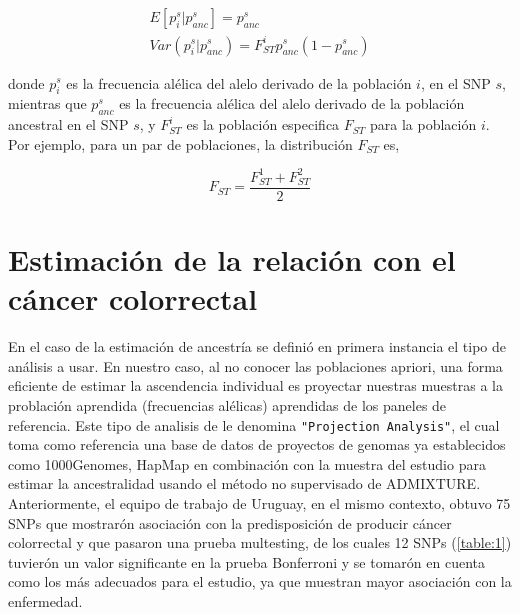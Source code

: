 \begin{align}
  E[p_{i}^{s} | p_{anc} ^{s}] = p_{anc}^{s} \\
  Var(p_{i}^{s} | p_{anc}^{s}) = F_{ST}^{i} p_{anc}^{s}(1-p_{anc}^{s})
\end{align}

donde $p_{i}^{s}$ es la frecuencia al\'elica del alelo derivado de la poblaci\'on $i$, en el SNP $s$, mientras que $p_{anc}^{s}$ es la frecuencia al\'elica del alelo derivado de la poblaci\'on ancestral en el SNP $s$, y $F_{ST}^{i}$ es la poblaci\'on especifica $F_{ST}$ para la poblaci\'on $i$. Por ejemplo, para un par de poblaciones, la distribuci\'on $F_{ST}$ es,

\begin{equation}
  F_{ST} = \frac{F_{ST}^{1} + F_{ST}^{2}}{2}
\end{equation}

\section{Estimaci\'on de la relaci\'on con el c\'ancer colorrectal}

En el caso de la estimaci\'on de ancestr\'ia se defini\'o en primera instancia el tipo de an\'alisis a usar. En nuestro caso, al no conocer las poblaciones apriori, una forma eficiente de estimar la ascendencia individual es proyectar nuestras muestras a la problaci\'on aprendida (frecuencias al\'elicas) aprendidas de los paneles de referencia. Este tipo de analisis de le denomina \texttt{"Projection Analysis"}, el cual toma como referencia una base de datos de proyectos de genomas ya establecidos como 1000Genomes, HapMap en combinaci\'on con la muestra del estudio para estimar la ancestralidad usando el m\'etodo no supervisado de ADMIXTURE. \\

Anteriormente, el equipo de trabajo de Uruguay, en el mismo contexto, obtuvo 75 SNPs que mostrar\'on asociaci\'on con la predisposici\'on de producir c\'ancer colorrectal y que pasaron una prueba multesting, de los cuales 12 SNPs (\ref{table:1}) tuvier\'on un valor significante en la prueba Bonferroni y se tomar\'on en cuenta como los m\'as adecuados para el estudio, ya que muestran mayor asociaci\'on con la enfermedad.  \\

